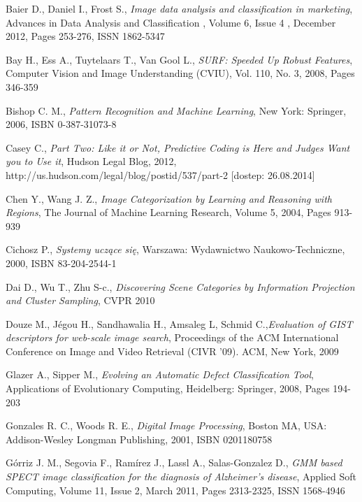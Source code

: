 \begin{thebibliography}{100} %

 Baier D., Daniel I., Frost S., \emph{Image data analysis and classification in marketing}, Advances in Data Analysis and Classification , Volume 6, Issue 4 , December 2012, Pages 253-276, ISSN 1862-5347

 Bay H., Ess A., Tuytelaars T., Van Gool L., \emph{SURF: Speeded Up Robust Features},  Computer Vision and Image Understanding (CVIU), Vol. 110, No. 3, 2008, Pages 346-359 

 Bishop C. M., \emph{Pattern Recognition and Machine Learning}, New York: Springer, 2006, ISBN 0-387-31073-8

 Casey C., \emph{Part Two: Like it or Not, Predictive Coding is Here and Judges Want you to Use it}, Hudson Legal Blog, 2012, http://us.hudson.com/legal/blog/postid/537/part-2 [dostep: 26.08.2014]

 Chen Y., Wang J. Z., \emph{Image Categorization by Learning and Reasoning with Regions}, The Journal of Machine Learning Research, Volume 5, 2004, Pages 913-939 

 Cichosz P., \emph{Systemy uczące się}, Warszawa: Wydawnictwo Naukowo-Techniczne, 2000, ISBN 83-204-2544-1

 Dai D., Wu T., Zhu S-c., \emph{Discovering Scene Categories by Information Projection and Cluster Sampling}, CVPR 2010

 Douze M., Jégou H., Sandhawalia H., Amsaleg L, Schmid C.,\emph{Evaluation of GIST descriptors for web-scale image search}, Proceedings of the ACM International Conference on Image and Video Retrieval (CIVR '09). ACM, New York, 2009

 Glazer A., Sipper M., \emph{Evolving an Automatic Defect Classification Tool}, Applications of Evolutionary Computing, Heidelberg: Springer, 2008, Pages 194-203

 Gonzales R. C., Woods R. E., \emph{Digital Image Processing}, Boston MA, USA: Addison-Wesley Longman Publishing, 2001, ISBN 0201180758

 Górriz J. M., Segovia F., Ramírez J., Lassl A., Salas-Gonzalez D., \emph{GMM based SPECT image classification for the diagnosis of Alzheimer’s disease}, Applied Soft Computing, Volume 11, Issue 2, March 2011, Pages 2313-2325, ISSN 1568-4946


\end{thebibliography}
